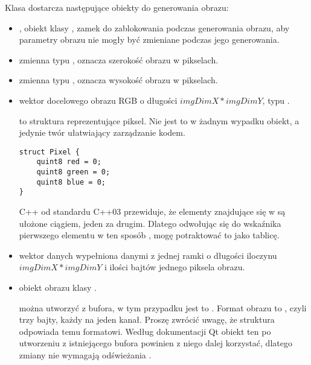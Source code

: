\label{sec:algorithm-pixmap-generate}

Klasa  dostarcza następujące obiekty do generowania obrazu:
\begin{itemize}
    \item {}, obiekt klasy , zamek do zablokowania podczas generowania obrazu, aby parametry obrazu nie mogły być zmieniane podczas jego generowania.

    \item {} zmienna typu , oznacza szerokość obrazu w pikselach.

    \item {} zmienna typu , oznacza wysokość obrazu w pikselach.

    \item {} wektor docelowego obrazu RGB o długości $imgDimX*imgDimY$, typu .

           to struktura reprezentujące piksel.
          Nie jest to w żadnym wypadku obiekt, a jedynie twór ułatwiający zarządzanie kodem.

          \begin{lstlisting}
struct Pixel {
    quint8 red = 0;   
    quint8 green = 0;    
    quint8 blue = 0;   
}\end{lstlisting}

        \par
        C++ od standardu C++03 przewiduje, że elementy znajdujące się w  są ułożone ciągiem, jeden za drugim.
        Dlatego odwołując się do wskaźnika pierwszego elementu w ten sposób , mogę potraktować to jako tablicę.

    \item {} wektor danych wypełniona danymi z jednej ramki o długości iloczynu $imgDimX*imgDimY$ i ilości bajtów jednego piksela obrazu.

    \item {} obiekt obrazu klasy .

           można utworzyć z bufora, w tym przypadku jest to .
          Format obrazu to , czyli trzy bajty, każdy na jeden kanał.
          Proszę zwrócić uwagę, że struktura  odpowiada temu formatowi.
          Według dokumentacji Qt obiekt ten po utworzeniu z istniejącego bufora powinien z niego dalej korzystać, dlatego zmiany  nie wymagają odświeżania .


\end{itemize}
